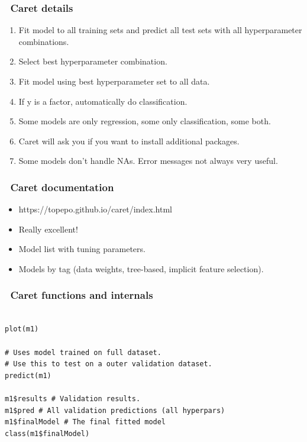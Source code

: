 \documentclass[handout, aspectratio = 169]{beamer}
\begin{document}
\begin{frame}
\frametitle{\insertframenumber~Caret details}
\begin{enumerate}
\item Fit model to all training sets and predict all test sets with all hyperparameter combinations.
\item Select best hyperparameter combination.
\item Fit model using best hyperparameter set to all data.
\item If y is a factor, automatically do classification.
\item Some models are only regression, some only classification, some both.
\item Caret will ask you if you want to install additional packages.
\item Some models don't handle NAs. Error messages not always very useful.
\end{enumerate}

\end{frame} 



\begin{frame}
\frametitle{\insertframenumber~Caret documentation}

\begin{itemize}
\item https://topepo.github.io/caret/index.html
\item Really excellent!
\item Model list with tuning parameters.
\item Models by tag (data weights, tree-based, implicit feature selection).
\end{itemize}
\end{frame} 




\begin{frame}[fragile]
\frametitle{\insertframenumber~Caret functions and internals}
\begin{Verbatim}

plot(m1)

# Uses model trained on full dataset.
# Use this to test on a outer validation dataset.
predict(m1) 

m1$results # Validation results.
m1$pred # All validation predictions (all hyperpars)
m1$finalModel # The final fitted model
class(m1$finalModel)


\end{Verbatim}

\end{frame} 
\end{document}
